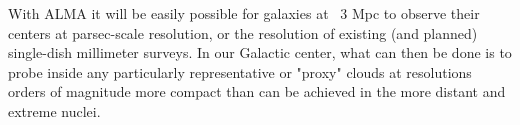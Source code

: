 With ALMA it will be easily possible for galaxies at ~3 Mpc to observe their centers at parsec-scale resolution, or the resolution of existing (and planned) single-dish millimeter surveys. In our Galactic center, what can then be done is to probe inside any particularly representative or "proxy" clouds at resolutions orders of magnitude more compact than can be achieved in the more distant and extreme nuclei.